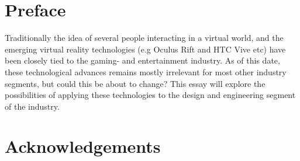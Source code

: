 % 
\chapter*{Preface}                    
Traditionally the idea of several people interacting in a virtual world, and the emerging virtual reality technologies (e.g Oculus Rift and HTC Vive etc) have been 
closely tied to the gaming- and entertainment industry. 
As of this date, these technological advances remains mostly irrelevant for most other industry segments, but could this be about to change? 
This essay will explore the possibilities of applying these technologies to the design and engineering segment of the industry.
\chapter*{Acknowledgements}  
% 